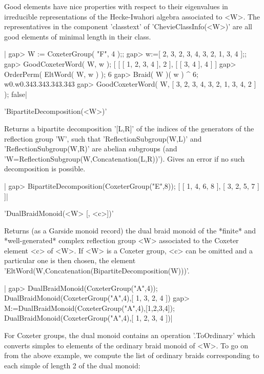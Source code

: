 Good  elements have  nice properties  with respect  to their eigenvalues in
irreducible  represen\-tations of  the Hecke-Iwahori  algebra associated to
<W>. The representatives in the component 'classtext' of
'ChevieClassInfo(<W>)'  are all  good elements  of minimal  length in their
class.

|    gap> W := CoxeterGroup( "F", 4 );;
    gap> w:=[ 2, 3, 2, 3, 4, 3, 2, 1, 3, 4 ];;
    gap> GoodCoxeterWord( W, w );
    [ [ [ 1, 2, 3, 4 ], 2 ], [ [ 3, 4 ], 4 ] ]
    gap> OrderPerm( EltWord( W, w ) );
    6
    gap> Braid( W )( w ) ^ 6;
    w0.w0.343.343.343.343
    gap>  GoodCoxeterWord( W, [ 3, 2, 3, 4, 3, 2, 1, 3, 4, 2 ] );
    false|


'BipartiteDecomposition(<W>)'

Returns  a bipartite decomposition '[L,R]' of the indices of the generators
of  the  reflection  group  'W',  such  that  'ReflectionSubgroup(W,L)' and
'ReflectionSubgroup(W,R)' are abelian subgroups (and
'W=ReflectionSubgroup(W,Concatenation(L,R))').  Gives an  error if  no such
decomposition is possible.

|    gap> BipartiteDecomposition(CoxeterGroup("E",8));
    [ [ 1, 4, 6, 8 ], [ 3, 2, 5, 7 ] ]|


'DualBraidMonoid(<W> [, <c>])'

Returns  (as a Garside monoid record) the dual braid monoid of the *finite*
and *well-generated* complex reflection group <W> associated to the Coxeter
element  <c> of <W>.  If <W> is  a Coxeter group,  <c> can be omitted and a
particular one is then chosen, the element
'EltWord(W,Concatenation(BipartiteDecomposition(W)))'.

|    gap> DualBraidMonoid(CoxeterGroup("A",4));
    DualBraidMonoid(CoxeterGroup("A",4),[ 1, 3, 2, 4 ])
    gap> M:=DualBraidMonoid(CoxeterGroup("A",4),[1,2,3,4]);
    DualBraidMonoid(CoxeterGroup("A",4),[ 1, 2, 3, 4 ])|

For  Coxeter groups,  the dual  monoid contains  an operation '.ToOrdinary'
which  converts simples to elements of the ordinary braid monoid of <W>. To
go  on  from  the  above  example,  we  compute the list of ordinary braids
corresponding to each simple of length 2 of the dual monoid:

